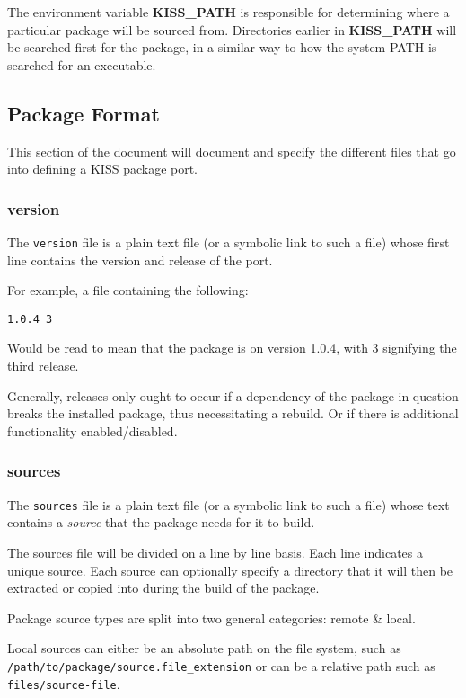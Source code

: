 \documentclass{article}
\begin{document}
The environment variable \textbf{KISS\_PATH} is responsible for determining
where a particular package will be sourced from. Directories earlier
in \textbf{KISS\_PATH} will be searched first for the package, in a similar
way to how the system PATH is searched for an executable.

\subsection{Package Format}

This section of the document will document and specify the different files
that go into defining a KISS package port.

\subsubsection{version}

The \texttt{version} file is a plain text file (or a symbolic link to such a
file) whose first line contains the version and release of the port.

For example, a file containing the following:

\begin{verbatim}
1.0.4 3
\end{verbatim}

Would be read to mean that the package is on version 1.0.4, with 3 signifying
the third release.

Generally, releases only ought to occur if a dependency of the package in
question breaks the installed package, thus necessitating a rebuild. Or
if there is additional functionality enabled/disabled.

\subsubsection{sources}

The \texttt{sources} file is a plain text file (or a symbolic link to such a
file) whose text contains a \textit{source} that the package needs for it to
build.

The sources file will be divided on a line by line basis. Each line
indicates a unique source. Each source can optionally specify a directory
that it will then be extracted or copied into during the build of the package.

Package source types are split into two general categories: remote \& local.

Local sources can either be an absolute path on the file system, such as
\texttt{/path/to/package/source.file\_extension} or can be a relative path
such as \texttt{files/source-file}.
\end{document}
